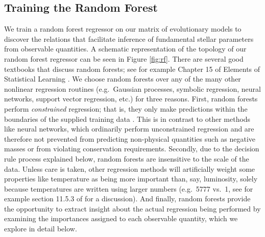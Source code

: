 \documentclass[manuscript]{aastex}
\begin{document}
\subsection{Training the Random Forest} \label{sec:forest}
We train a random forest regressor on our matrix of evolutionary models to discover the relations that facilitate inference of fundamental stellar parameters from observable quantities. A schematic representation of the topology of our random forest regressor can be seen in Figure \ref{fig:rf}. There are several good textbooks that discuss random forests; see for example Chapter 15 of Elements of Statistical Learning \citep{hastie2005elements}. We choose random forests over any of the many other nonlinear regression routines (e.g.~Gaussian processes, symbolic regression, neural networks, support vector regression, etc.) for three reasons. First, random forests perform \emph{constrained} regression; that is, they only make predictions within the boundaries of the supplied training data \citep[see e.g.~section 9.2.1 of][]{hastie2005elements}. This is in contrast to other methods like neural networks, which ordinarily perform unconstrained regression and are therefore not prevented from predicting non-physical quantities such as negative masses or from violating conservation requirements. Secondly, due to the decision rule process explained below, random forests are insensitive to the scale of the data. Unless care is taken, other regression methods will artificially weight some properties like temperature as being more important than, say, luminosity, solely because temperatures are written using larger numbers (e.g.~5777 vs.~1, see for example section 11.5.3 of \citealt{hastie2005elements} for a discussion). And finally, random forests provide the opportunity to extract insight about the actual regression being performed by examining the importances assigned to each observable quantity, which we explore in detail below. 
\end{document}
